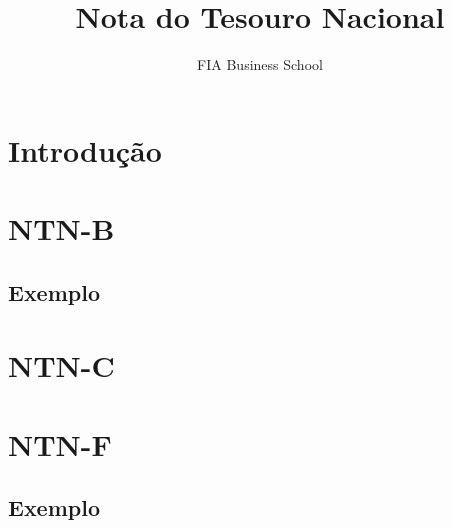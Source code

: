 \documentclass{article}\usepackage[]{graphicx}\usepackage[]{xcolor}
\title{Nota do Tesouro Nacional}
\author{FIA Business School}
\begin{document}
\maketitle

\section*{Introdução}

\section*{NTN-B}

\subsection*{Exemplo}

\section*{NTN-C}

\section*{NTN-F}

\subsection*{Exemplo}
\end{document}
